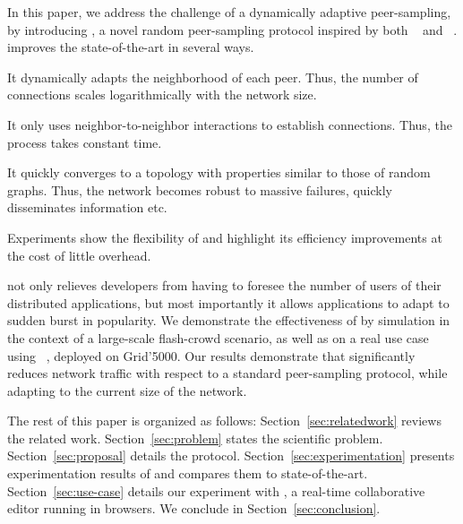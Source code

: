 In this paper, we address the challenge of a dynamically adaptive peer-sampling,
by introducing \SPRAY, a novel random peer-sampling protocol inspired by both
\SCAMP~\cite{ganesh2001scamp,ganesh2003peer} and
\CYCLON~\cite{voulgaris2005cyclon}. \SPRAY improves the state-of-the-art in
several ways.
\begin{inparaenum}[(i)]
\item It dynamically adapts the neighborhood of each peer. Thus, the number of
  connections scales logarithmically with the network size.
\item It only uses neighbor-to-neighbor interactions to establish
  connections. Thus, the process takes constant time.
\item It quickly converges to a topology with properties similar to
  those of random graphs. Thus, the network becomes robust to massive
  failures, quickly disseminates information etc.
\item Experiments show the flexibility of \SPRAY and highlight its
  efficiency improvements at the cost of little overhead.
\end{inparaenum}

\SPRAY not only relieves developers from having to foresee the number
of users of their distributed applications, but most importantly it
allows applications to adapt to sudden burst in popularity. We
demonstrate the effectiveness of \SPRAY by simulation in the context
of a large-scale flash-crowd scenario, as well as on a real use case
using \CRATE~\cite{nedelec2016crate}, deployed on Grid'5000. Our
results demonstrate that \SPRAY significantly reduces network traffic
with respect to a standard peer-sampling protocol, while adapting to
the current size of the network.


The rest of this paper is organized as follows: Section~\ref{sec:relatedwork}
reviews the related work. Section~\ref{sec:problem} states the scientific
problem. Section~\ref{sec:proposal} details the \SPRAY
protocol. Section~\ref{sec:experimentation} presents experimentation results of
\SPRAY and compares them to state-of-the-art. Section~\ref{sec:use-case} details
our experiment with \CRATE, a real-time collaborative editor running in
browsers. We conclude in Section~\ref{sec:conclusion}.




